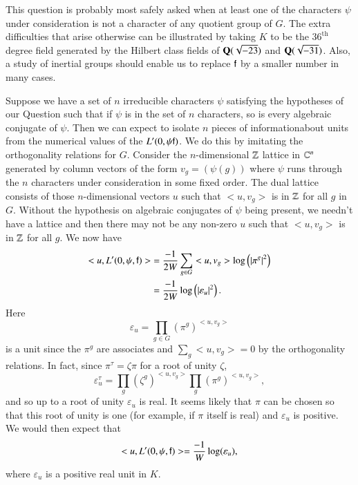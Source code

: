 This question is probably most safely asked when at least one of the
characters $\psi$ under consideration is not a character of any quotient group of $G$. The extra difficulties that arise otherwise can be illustrated by taking $K$ to be the $36^{\text{th}}$ degree field generated by the Hilbert class fields  of $\mathbf{Q} (\sqrt{-23})$ and $\mathbf{Q} (\sqrt{-31})$. Also, a study of inertial groups should enable us to replace $\mathsf{f}$ by a smaller number in many cases.

Suppose we have a set of $n$ irreducible characters $\psi$ satisfying the hypotheses of our Question such that if $\psi$ is in the set of $n$ characters, so is every algebraic conjugate of $\psi$. Then we can expect to isolate $n$ pieces of information\pageoriginale about units from the numerical values of the $L' (0, \psi \mathsf{f})$. We do this by imitating the orthogonality relations for $G$. Consider the $n$-dimensional $\mathbb{Z}$ lattice in $\mathbb{C}^n$ generated by column vectors of the form $v_g = (\psi (g))$ where $\psi$ runs through the $n$ characters under consideration in some fixed order. The dual lattice consists of those $n$-dimensional vectors $u$ such that $< u, v_g>$ is in $\mathbb{Z}$ for all $g$ in $G$. Without the hypothesis on algebraic conjugates of $\psi$ being present, we needn't have a lattice and then there may not be any non-zero $u$ such that $< u, v_g>$ is in $\mathbb{Z}$ for all $g$. We now have 
\begin{align*}
< u, L' (0, \psi, \mathsf{f}) > & = \frac{-1}{2W} \sum\limits_{g \in G} <u, v_g> \log \left(\left|\pi^g \right|^2 \right)\\
& = \frac{-1}{2W} \log \left(\left|\varepsilon_u \right|^2 \right).
\end{align*}
Here
$$
\varepsilon_u = \prod\limits_{g \in G} (\pi^g)^{<u, v_g>}
$$
is a unit since the $\pi^g$ are associates and $\sum\limits_g <u, v_g> =0$ by the orthogonality relations. In fact, since $\pi^\tau = \zeta \pi$ for a root of unity $\zeta$,
$$
\varepsilon^\tau_u = \prod\limits_g (\zeta^g)^{<u, v_g>} \prod\limits_{g} (\pi^g)^{<u, v_g>},
$$
and so up to a root of unity $\varepsilon_u$ is real. It seems likely that $\pi$ can be chosen so that this root of unity is one (for example, if $\pi$ itself is real) and $\varepsilon_u$ is positive. We would then expect that 
\begin{equation}
<u, L' (0, \psi, \mathsf{f})> = \frac{-1}{W} \log (\varepsilon_u), \label{art9-eq1}
\end{equation}
where $\varepsilon_u$ is a positive real unit in $K$.

